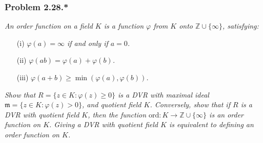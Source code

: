 \documentclass{article}
\begin{document}
\subsubsection*{Problem 2.28.*}
\emph{An order function on a field $K$ is a function $\varphi$
from $K$ onto $\mathbb{Z} \cup \{ \infty \}$, satisfying:}
\begin{enumerate}
\item[(i)]
  \emph{$\varphi(a) = \infty$ if and only if $a = 0$.}

\item[(ii)]
  \emph{$\varphi(ab) = \varphi(a) + \varphi(b)$.}

\item[(iii)]
  \emph{$\varphi(a + b) \geq \min(\varphi(a), \varphi(b))$.}
\end{enumerate}
\emph{Show that $R = \{z \in K : \varphi(z) \geq 0 \}$ is a DVR
with maximal ideal $\mathfrak{m} = \{ z \in K : \varphi(z) > 0 \}$, and quotient field $K$.
Conversely, show that if $R$ is a DVR with quotient field $K$,
then the function $\mathrm{ord}: K \to \mathbb{Z} \cup \{ \infty \}$ is an order function on $K$.
Giving a DVR with quotient field $K$ is equivalent to defining an order function on $K$.} \\
\end{document}

